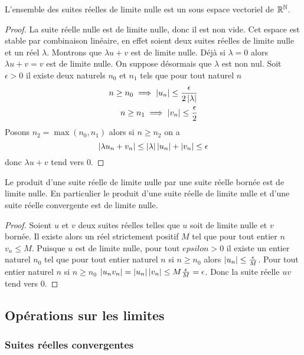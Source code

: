 \begin{prop}
  L'ensemble des suites réelles de limite nulle est un sous espace vectoriel de $\mathbb{R}^{\mathbb{N}}$.
\end{prop}
\begin{proof}
  La suite réelle nulle est de limite nulle, donc il est non vide. Cet espace est stable par combinaison linéaire, en effet soient deux suites réelles de limite nulle et un réel $\lambda$. Montrons que $\lambda u+v$ est de limite nulle. Déjà si $\lambda=0$ alors $\lambda u+v=v$ est de limite nulle. On suppose désormais que $\lambda$ est non nul. Soit $\epsilon>0$ il existe deux naturels $n_0$ et $n_1$ tels que pour tout naturel $n$
  \begin{align}
    n \geq n_0 \implies \left\lvert u_n\right\rvert \leq \frac{\epsilon}{2\left\lvert\lambda\right\rvert} \\ n \geq n_1 \implies \left\lvert v_n\right\rvert \leq \frac{\epsilon}{2}
  \end{align}
  Posons $n_2=\max(n_0,n_1)$ alors si $n \geq n_2$ on a
  \begin{equation}
    \left\lvert\lambda u_n + v_n\right\rvert\leq \left\lvert\lambda\right\rvert\left\lvert u_n\right\rvert+\left\lvert v_n\right\rvert\leq \epsilon
  \end{equation}
  donc $\lambda u+v$ tend vers 0.
\end{proof}
%
\begin{prop}
  Le produit d'une suite réelle de limite nulle par une suite réelle bornée est de limite nulle. En particulier le produit d'une suite réelle de limite nulle et d'une suite réelle convergente est de limite nulle.
\end{prop}
\begin{proof}
  Soient $u$ et $v$ deux suites réelles telles que $u$ soit de limite nulle et $v$ bornée. Il existe alors un réel strictement positif $M$ tel que pour tout entier $n$ $v_n \leq M$. Puisque $u$ est de limite nulle, pour tout $epsilon>0$ il existe un entier naturel $n_0$ tel que pour tout entier naturel $n$ si $n \geq n_0$ alors $\left\lvert u_n\right\rvert \leq \frac{\epsilon}{M}$. Pour tout entier naturel $n$  si $n \geq n_0$ $\left\lvert u_n v_n\right\rvert=\left\lvert u_n\right\rvert\left\lvert v_n\right\rvert\leq M \frac{\epsilon}{M}=\epsilon$. Donc la suite réelle $uv$ tend vers 0.
\end{proof}

\subsection{Opérations sur les limites}

\subsubsection{Suites réelles convergentes}

